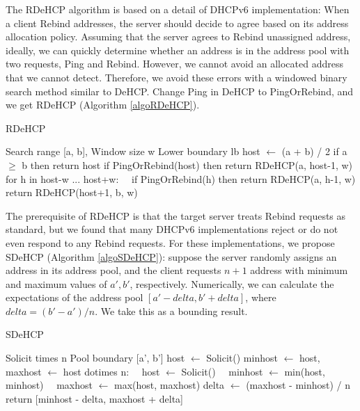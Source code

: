 \documentclass[conference]{IEEEtran}
\begin{document}
The RDeHCP algorithm is based on a detail of DHCPv6 implementation:
When a client Rebind addresses, the server should decide to agree
based on its address allocation policy. Assuming that the server
agrees to Rebind unassigned address, ideally, we can quickly determine
whether an address is in the address pool with two requests, Ping and
Rebind. However, we cannot avoid an allocated address that we cannot
detect. Therefore, we avoid these errors with a windowed binary search
method similar to DeHCP. Change Ping in DeHCP to PingOrRebind, and we
get RDeHCP (Algorithm \ref{algoRDeHCP}).

\begin{algorithm}[H]
  \caption{RDeHCP}
  \label{algoRDeHCP}
  \renewcommand{\algorithmicrequire}{\textbf{Input:}}
  \renewcommand{\algorithmicensure}{\textbf{Output:}}
  \begin{algorithmic}[1]
    \REQUIRE Search range [a, b], Window size w
    \ENSURE Lower boundary lb
    \STATE host $\gets$ (a + b) / 2
    \STATE if a $\ge$ b then return host
    \STATE if PingOrRebind(host) then return RDeHCP(a, host-1, w)
    \STATE for h in host-w ... host+w:
    \STATE \ \ if PingOrRebind(h) then return RDeHCP(a, h-1, w)
    \STATE return RDeHCP(host+1, b, w)
  \end{algorithmic}
\end{algorithm}

The prerequisite of RDeHCP is that the target server treats Rebind
requests as standard, but we found that many DHCPv6 implementations
reject or do not even respond to any Rebind requests. For these
implementations, we propose SDeHCP (Algorithm \ref{algoSDeHCP}):
suppose the server randomly assigns an address in its address pool,
and the client requests $n+1$ address with minimum and maximum values
of $a', b'$, respectively. Numerically, we can calculate the
expectations of the address pool $[a'-delta, b'+delta]$, where
$delta = (b'-a')/n$. We take this as a bounding result.

\begin{algorithm}[H]
  \caption{SDeHCP}
  \label{algoSDeHCP}
  \renewcommand{\algorithmicrequire}{\textbf{Input:}}
  \renewcommand{\algorithmicensure}{\textbf{Output:}}
  \begin{algorithmic}[1]
    \REQUIRE Solicit times n
    \ENSURE Pool boundary [a', b']
    \STATE host $\gets$ Solicit()
    \STATE minhost $\gets$ host, maxhost $\gets$ host
    \STATE dotimes n:
    \STATE \ \ host $\gets$ Solicit()
    \STATE \ \ minhost $\gets$ min(host, minhost)
    \STATE \ \ maxhost $\gets$ max(host, maxhost)
    \STATE delta $\gets$ (maxhost - minhost) / n
    \STATE return [minhost - delta, maxhost + delta]
  \end{algorithmic}
\end{algorithm}
\end{document}
